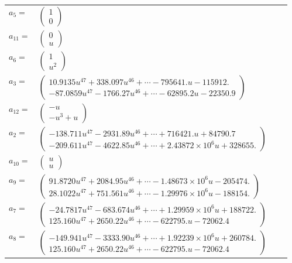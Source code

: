 \documentclass[1p]{elsarticle_modified}
\theoremstyle{definition}
\begin{document}
\begin{tabular}{m{7pt} m{180pt} m{7pt} m{180pt} }
\flushright $a_{5}=$&$\begin{pmatrix}1\\0\end{pmatrix}$ \\
\flushright $a_{11}=$&$\begin{pmatrix}0\\u\end{pmatrix}$ \\
\flushright $a_{6}=$&$\begin{pmatrix}1\\u^2\end{pmatrix}$ \\
\flushright $a_{3}=$&$\begin{pmatrix}10.9135 u^{47}+338.097 u^{46}+\cdots-795641. u-115912.\\-87.0859 u^{47}-1766.27 u^{46}+\cdots-62895.2 u-22350.9\end{pmatrix}$ \\
\flushright $a_{12}=$&$\begin{pmatrix}- u\\- u^3+u\end{pmatrix}$ \\
\flushright $a_{2}=$&$\begin{pmatrix}-138.711 u^{47}-2931.89 u^{46}+\cdots+716421. u+84790.7\\-209.611 u^{47}-4622.85 u^{46}+\cdots+2.43872\times10^{6} u+328655.\end{pmatrix}$ \\
\flushright $a_{10}=$&$\begin{pmatrix}u\\u\end{pmatrix}$ \\
\flushright $a_{9}=$&$\begin{pmatrix}91.8720 u^{47}+2084.95 u^{46}+\cdots-1.48673\times10^{6} u-205474.\\28.1022 u^{47}+751.561 u^{46}+\cdots-1.29976\times10^{6} u-188154.\end{pmatrix}$ \\
\flushright $a_{7}=$&$\begin{pmatrix}-24.7817 u^{47}-683.674 u^{46}+\cdots+1.29959\times10^{6} u+188722.\\125.160 u^{47}+2650.22 u^{46}+\cdots-622795. u-72062.4\end{pmatrix}$ \\
\flushright $a_{8}=$&$\begin{pmatrix}-149.941 u^{47}-3333.90 u^{46}+\cdots+1.92239\times10^{6} u+260784.\\125.160 u^{47}+2650.22 u^{46}+\cdots-622795. u-72062.4\end{pmatrix}$ \\

\end{tabular}
\end{document}
